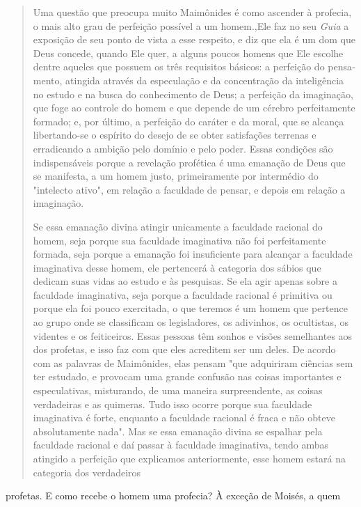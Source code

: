 \begin{quote}
Uma questão que preocupa muito Maimônides é como ascender à profecia, o
mais alto grau de perfeição possível a um homem.,Ele faz no seu
\emph{Guia} a exposição de seu ponto de vista a esse respeito, e diz que
ela é um dom que Deus concede, quando Ele quer, a alguns poucos homens
que Ele escolhe dentre aqueles que possuem os três requisitos básicos: a
perfeição do pensa­mento, atingida através da especulação e da
concentração da inteligência no estudo e na busca do conhecimento de
Deus; a perfeição da imaginação, que foge ao controle do homem e que
depende de um cérebro perfeitamente for­mado; e, por último, a perfeição
do caráter e da moral, que se alcança libertando-se o espírito do desejo
de se obter satisfações terrenas e erradicando a ambição pelo domínio e
pelo poder. Essas condições são indispensáveis porque a reve­lação
profética é uma emanação de Deus que se manifesta, a um homem justo,
primeiramente por intermédio do "intelecto ativo", em relação a
faculdade de pensar, e depois em relação a imaginação.

Se essa emanação divina atingir unicamente a faculdade racional do
homem, seja porque sua faculdade imaginativa não foi perfeitamente
formada, seja porque a emanação foi insuficiente para alcançar a
faculdade imaginativa desse homem, ele pertencerá à categoria dos sábios
que dedicam suas vidas ao estudo e às pesquisas. Se ela agir apenas
sobre a faculdade imaginativa, seja por­que a faculdade racional é
primitiva ou porque ela foi pouco exercitada, o que teremos é um homem
que pertence ao grupo onde se classificam os legislado­res, os
adivinhos, os ocultistas, os videntes e os feiticeiros. Essas pessoas
têm sonhos e visões semelhantes aos dos profetas, e isso faz com que
eles acredi­tem ser um deles. De acordo com as palavras de Maimônides,
elas pensam "que adquiriram ciências sem ter estudado, e provocam uma
grande confusão nas coisas importantes e especulativas, misturando, de
uma maneira surpreenden­te, as coisas verdadeiras e as quimeras. Tudo
isso ocorre porque sua faculdade imaginativa é forte, enquanto a
faculdade racional é fraca e não obteve absolu­tamente nada". Mas se
essa emanação divina se espalhar pela faculdade racio­nal e daí passar à
faculdade imaginativa, tendo ambas atingido a perfeição que explicamos
anteriormente, esse homem estará na categoria dos verdadeiros
\end{quote}

profetas. E como recebe o homem uma profecia? À exceção de Moisés, a
quem

